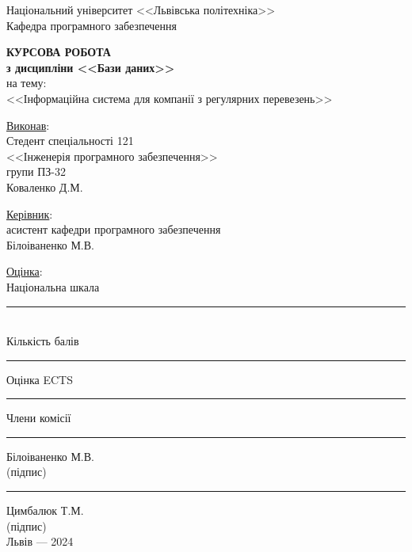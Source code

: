 \documentclass[oneside,14pt]{extarticle}
\begin{document}
\begin{titlepage}
	\begin{center}
		Національний університет <<Львівська політехніка>>\\
		Кафедра програмного забезпечення
		
		\vspace{40pt}
		\textbf{\LARGE КУРСОВА РОБОТА}\\
		{\large
		\textbf{з дисципліни <<Бази даних>>}\\
		на тему:\\
		<<Інформаційна система для компанії з регулярних перевезень>>
		}
		\vspace*{40pt}
		
		\begin{flushright}
		    \begin{minipage}{0.6\textwidth}
		        \underline{Виконав}:\\
                Стедент спеціальності 121\\
			    <<Інженерія програмного забезпечення>>\\
			    групи ПЗ-32\\
			    Коваленко Д.М.
			    \bigbreak
			    
			    \underline{Керівник}:\\
			    асистент кафедри програмного забезпечення\\
			    Білоіваненко М.В.
			    \bigbreak
			    
			    \underline{Оцінка}:\\
			    Національна шкала \rule{6.35cm}{0.15mm}\\			
			    Кількість балів \rule{2cm}{0.15mm} Оцінка ECTS \rule{2cm}{0.15mm}
			    \bigbreak
            \end{minipage}
		\end{flushright}
		\vspace{40pt}
		Члени комісії \hspace{1.9cm} \rule{3cm}{0.15mm} \hspace{1cm} Білоіваненко М.В.\\
		{\small\vspace{-5pt}(підпис)}\\
		\hspace{2.65cm}\hspace{1.9cm}  \rule{3cm}{0.15mm} \hspace{1cm} Цимбалюк Т.М.\\
		{\small\vspace{-5pt}(підпис)}\\
		
		\vspace{\fill}
		Львів — 2024
	\end{center}
\end{titlepage}
\setcounter{page}{2}
\tableofcontents
\newpage
\end{document}
